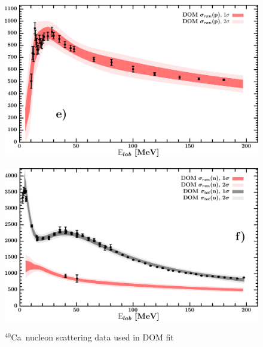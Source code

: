 \documentclass[twocolumn,secnumarabic,amssymb, nobibnotes, aps, prl,
superscriptaddress, nobalancelastpage]{revtex4}
\newcommand{\caForty}{\ensuremath{^{40}}C\lowercase{a}}
\begin{document}
\begin{figure}[!htb]
\begin{minipage}{0.4\linewidth}
        \label{DOM_ca40_neutron_elastic}
    \end{minipage}
    \centering
    \begin{minipage}{0.4\linewidth}
        \centering
        \includegraphics[width=\linewidth]{figures/ca40_protonInelastic.png}
        \label{DOM_ca40_proton_inelastic}
    \end{minipage}\hspace{6pt}
    \begin{minipage}{0.4\linewidth}
        \centering
        \includegraphics[width=\linewidth]{figures/ca40_neutronInelastic.png}
        \label{DOM_ca40_neutron_inelastic}
    \end{minipage}
    \caption{\caForty\ nucleon scattering data used in DOM fit}
    \label{DOM_ca40_scattering}
    \centering
    \begin{minipage}{0.4\linewidth}
        \centering

\end{minipage}
\end{figure}
\end{document}
